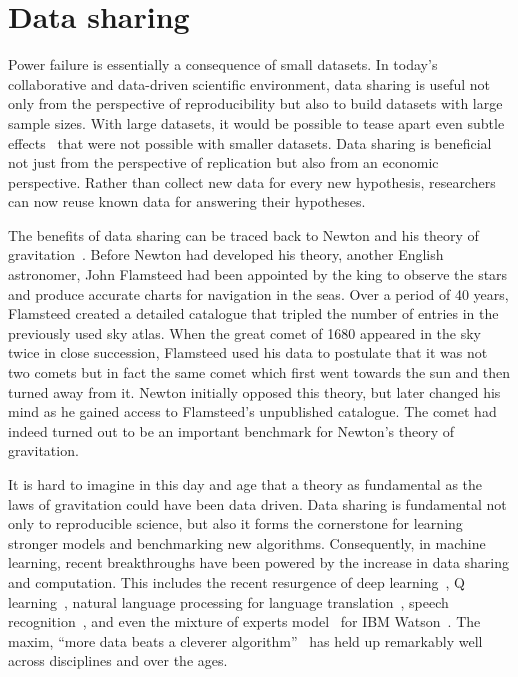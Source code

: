 \section{Data sharing}
\label{sec:intro_datasharing}
Power failure is essentially a consequence of small datasets. In today's collaborative and data-driven scientific environment, data sharing is useful not only from the perspective of reproducibility but also to build datasets with large sample sizes. With large datasets, it would be possible to tease apart even subtle effects~\citep{smith2017statistical} that were not possible with smaller datasets. Data sharing is beneficial not just from the perspective of replication but also from an economic perspective. Rather than collect new data for every new hypothesis, researchers can now reuse known data for answering their hypotheses.

The benefits of data sharing can be traced back to Newton and his theory of gravitation~\citep{pointofview2013}. Before Newton had developed his theory, another English astronomer, John Flamsteed had been appointed by the king to observe the stars and produce accurate charts for navigation in the seas. Over a period of 40 years, Flamsteed created a detailed catalogue that tripled the number of entries in the previously used sky atlas. When the great comet of 1680 appeared in the sky twice in close succession, Flamsteed used his data to postulate that it was not two comets but in fact the same comet which first went towards the sun and then turned away from it. Newton initially opposed this theory, but later changed his mind as he gained access to Flamsteed's unpublished catalogue. The comet had indeed turned out to be an important benchmark for Newton's theory of gravitation.

It is hard to imagine in this day and age that a theory as fundamental as the laws of gravitation could have been data driven. Data sharing is fundamental not only to reproducible science, but also it forms the cornerstone for learning stronger models and benchmarking new algorithms. Consequently, in machine learning, recent breakthroughs have been powered by the increase in data sharing and computation. This includes the recent resurgence of deep learning~\citep{deng2009imagenet}, Q learning~\citep{watkins1992q, bellemare2013arcade}, natural language processing for language translation~\citep{halevy2009unreasonable}, speech recognition~\citep{paul1992design}, and even the mixture of experts model~\citep{jacobs1991adaptive} for IBM Watson~\citep{ferrucci2010building}. The maxim, ``more data beats a cleverer algorithm''~\citep{domingos2012few} has held up remarkably well across disciplines and over the ages.


